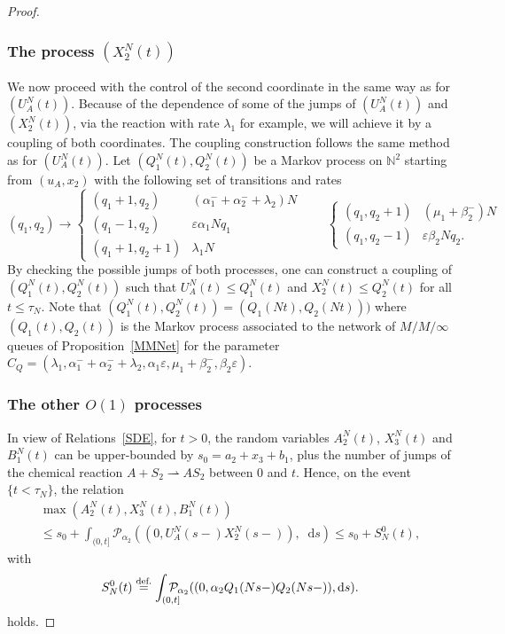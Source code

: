 \documentclass[english]{amsart}
\newcommand{\N}{\ensuremath{\mathbb{N}}}
\newcommand{\diff}{\mathop{}\mathopen{}\mathrm{d}}
\newcommand{\cal}[1]{\ensuremath{\mathcal{#1}}}
\newcommand\steq[1]{\stackrel{\text{\rm #1.}}{=}}
\def\eps{\varepsilon}
\numberwithin{proposition}{section}
\begin{document}
\begin{proof}
\subsubsection{The process $(X_2^N(t))$}\label{CoupX2Sec}
We now proceed with the control of the second coordinate in the same way as for $(U_A^N(t))$. Because of the dependence of some of the jumps of $(U_A^N(t))$ and $(X_2^N(t))$, via the reaction with rate $\lambda_1$ for example, we will achieve it by a coupling of both coordinates. The coupling construction follows the same method as for $(U_A^N(t))$. Let $(Q_1^N(t),Q_2^N(t))$ be a Markov process on $\N^2$ starting from $(u_A,x_2)$ with the following set of transitions and rates
\[
(q_1,q_2)\longrightarrow
\begin{cases}
  (q_1+1,q_2)&(\alpha_1^-{+}\alpha_2^-{+}\lambda_2)N\\
  (q_1-1,q_2)&\eps\alpha_1N q_1\\
  (q_1+1,q_2+1)&\lambda_1 N
\end{cases}
\qquad
\begin{cases}
  (q_1,q_2+1)&(\mu_1+\beta_2^-)N\\
  (q_1,q_2-1)&\eps\beta_2N q_2.
\end{cases}
\]
By checking the possible jumps of both processes, one can construct a coupling  of $(Q_1^N(t),Q_2^N(t))$ such that
$U_A^N(t){\le} Q_1^N(t)$ and $X_2^N(t){\le}Q_2^N(t)$ for all $t{\le}\tau_N$. Note that
$(Q_1^N(t),Q_2^N(t)){=}(Q_1(Nt),Q_2(Nt)))$ where $(Q_1(t),Q_2(t))$ is the Markov process associated to the network of $M/M/\infty$ queues of Proposition~\ref{MMNet} for the parameter $C_Q{=}(\lambda_1,\alpha_1^-{+}\alpha_2^-{+}\lambda_2,\alpha_1\eps,\mu_1+\beta_2^-,\beta_2\eps)$.

\subsubsection{The other $O(1)$ processes}\label{CoupO1Sec}
In view of Relations~\eqref{SDE}, for $t{>}0$,  the random variables $A_2^N(t)$, $X_3^N(t)$ and  $B_1^N(t)$ can be upper-bounded by $s_0{=}a_2{+}x_3{+}b_1$, plus the number of jumps of the chemical reaction $A{+}S_2{\rightharpoonup}AS_2$ between $0$ and $t$. Hence, on the event $\{t{<}\tau_N\}$,  the relation
\begin{multline}\label{CoupIneq1}
\max(A_2^N(t),X_3^N(t),B_1^N(t))\\\leq s_0{+}\int_{(0,t]}\cal{P}_{\alpha_2}((0,U_A^N(s{-})X_2^N(s{-})), \diff s)\le  s_0{+}S^0_N(t),
\end{multline}
with
\[
    S^0_N(t)\steq{def} \int_{(0,t]}\hspace{-4mm}\cal{P}_{\alpha_2}((0,\alpha_2Q_1(Ns{-})Q_2(Ns{-})), \diff s).
\]
holds. 


\end{proof}
\end{document}
